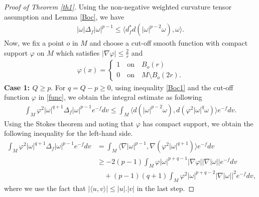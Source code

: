 \documentclass[leqno,12pt]{article} %
\theoremstyle{plain} %
\theoremstyle{definition} %
\numberwithin{equation}{section}
\begin{document}
\begin{proof}[Proof of Theorem \ref{th1}]
	Using the non-negative weighted curvature tensor assumption and Lemma \ref{Boc}, we have
	\begin{align}\label{Boc1}
			|\omega| \Delta_f |\omega|^{p-1} \le  \langle d^*_f d (|\omega|^{p-2}\omega), \omega \rangle.
	\end{align}
	Now, we fix a point $o$ in $M$ and choose a cut-off smooth function with compact support $\varphi$ on $M$ which satisfies $|\nabla \varphi|\le \frac{2}{r}$ and
\begin{align}\label{func}
		\varphi(x)= \begin{cases}
		1 \quad \text{on} \quad B_o(r)\\
		0 \quad \text{on} \quad M\setminus B_o(2r).
	\end{cases}
\end{align}	
\textbf{Case 1: $Q \ge p$}.  For $q=Q-p\ge 0$,	using inequality \eqref{Boc1} and the cut-off function $\varphi$ in \eqref{func}, we obtain the integral estimate as following
	\begin{align} \label{c11}
		\int_M \varphi ^2|\omega |^{q+1} \Delta_f |\omega |^{p-1}e^{-f} dv \le 
		\int_M \langle d(|\omega|^{p-2}\omega),d(\varphi^2 |\omega|^q\omega) \rangle e^{-f}dv.		
	\end{align}
Using the Stokes theorem and noting that $\varphi$ has compact support, we obtain the following inequality for the left-hand side.
\begin{align}\label{del1}  \nonumber
	\int_M {{\varphi ^2}|\omega |^{q+1}\Delta_f |\omega |^{p-1}} e^{-f}dv 
	&=\int_M \langle \nabla |\omega|^{p-1}, \nabla ( \varphi^2 |\omega|^{q+1}) \rangle e^{-f}dv \nonumber \\ 
		&\ge  -2(p-1)\int_M {\varphi |\omega |^{p+q-1}  | \nabla \varphi| |\nabla |\omega | | } e^{-f}dv\nonumber \\& \quad+ 
	(p-1)(q+1) \int_M {{\varphi ^2}|\omega|^{p+q-2} |\nabla |\omega |{|^2}}e^{-f}dv,
\end{align}	
where we use the fact that $|\langle u, v \rangle |\le |u|.|v|$ in the last step.


\end{proof}
\end{document}

